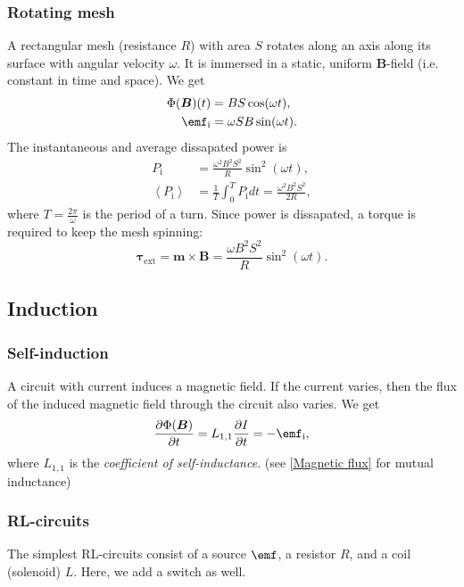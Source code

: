 \documentclass[a4paper, 12pt]{article}
\renewcommand{\vec}[1]{\bm{#1}}
\newcommand{\B}{\ensuremath{\vec{B}}}
\begin{document}
        \subsubsection{Rotating mesh}
            A rectangular mesh (resistance $R$) with area $S$ rotates along an axis along its surface with angular velocity $\omega$. 
            It is immersed in a static, uniform \B-field (i.e. constant in time and space).
            We get 
            \begin{align}
                \Phi(\B)(t) &= BS\cos (\omega t), \\
                \emf_\text{i} &= \omega S B \sin (\omega t).
            \end{align}
            The instantaneous and average dissapated power is 
            \begin{align}
                P_\text{i} &= \frac{\omega^2 B^2 S^2}{R}\sin^2(\omega t),\\
                \left<P_\text{i}\right> &= \frac{1}{T}\int_0^T P_\text{i}dt = \frac{\omega^2 B^2 S^2}{2R},
            \end{align}
            where $T = \frac{2\pi}{\omega}$ is the period of a turn.
            Since power is dissapated, a torque is required to keep the mesh spinning: 
            \begin{equation}
                \vec{\tau}_\text{ext} = \vec{m}\times\B = \frac{\omega B^2 S^2}{R}\sin^2(\omega t).
            \end{equation}
        
    \subsection{Induction}
        \subsubsection{Self-induction}
            A circuit with current induces a magnetic field. 
            If the current varies, then the flux of the induced magnetic field through the circuit also varies. 
            We get
            \begin{equation}
                \frac{\partial \Phi(\B)}{\partial t} = L_{1,1}\frac{\partial I}{\partial t} = -\emf_{\text{i}},
            \end{equation}
            where $L_{1,1}$ is the \textit{coefficient of self-inductance}. (see \ref{Magnetic flux} for mutual inductance)
            
        \subsubsection{RL-circuits}
            The simplest RL-circuits consist of a source $\emf$, a resistor $R$, and a coil (solenoid) $L$.
            Here, we add a switch as well.
\end{document}
